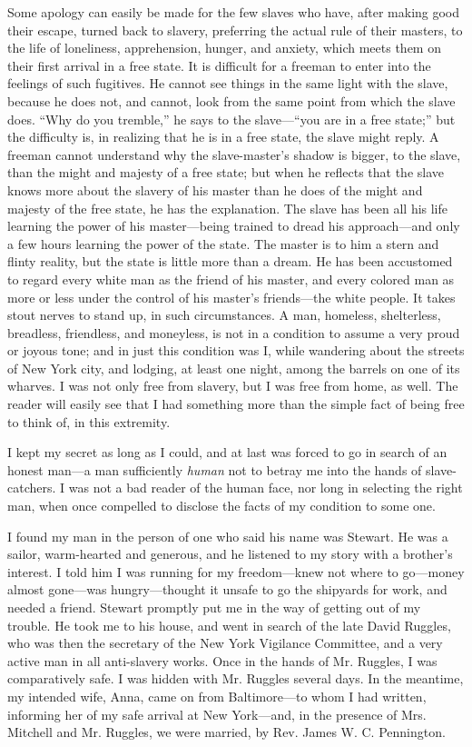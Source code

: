 Some apology can easily be made for the few slaves who have, after
making good their escape, turned back to slavery, preferring the actual
rule of their masters, to the life of loneliness, apprehension, hunger,
and anxiety, which meets them on their first arrival in a free state. It
is difficult for a freeman to enter into the feelings of such fugitives.
He cannot see things in the same light with the slave, because he does
not, and cannot, look from the same point from which the slave does.
``Why do you tremble,'' he says to the slave---``you are in a free
state;'' but the difficulty is, in realizing that he is in a free state,
the slave might reply. A freeman cannot understand why the
slave-master's shadow is bigger, to the slave, than the might and
majesty of a free state; but when he reflects that the slave knows more
about the slavery of his master than he does of the might and majesty of
the free state, he has the explanation. The slave has been all his life
learning the power of his master---being trained to dread his
approach---and only a few hours learning the power of the state. The
master is to him a stern and flinty reality, but the state is little
more than a dream. He has been accustomed to regard every white man as
the friend of his master, and every colored man as more or less under
the control of his {}master's friends---the white people. It takes stout
nerves to stand up, in such circumstances. A man, homeless, shelterless,
breadless, friendless, and moneyless, is not in a condition to assume a
very proud or joyous tone; and in just this condition was I, while
wandering about the streets of New York city, and lodging, at least one
night, among the barrels on one of its wharves. I was not only free from
slavery, but I was free from home, as well. The reader will easily see
that I had something more than the simple fact of being free to think
of, in this extremity.

I kept my secret as long as I could, and at last was forced to go in
search of an honest man---a man sufficiently \emph{human} not to betray
me into the hands of slave-catchers. I was not a bad reader of the human
face, nor long in selecting the right man, when once compelled to
disclose the facts of my condition to some one.

I found my man in the person of one who said his name was Stewart. He
was a sailor, warm-hearted and generous, and he listened to my story
with a brother's interest. I told him I was running for my
freedom---knew not where to go---money almost gone---was
hungry---thought it unsafe to go the shipyards for work, and needed a
friend. Stewart promptly put me in the way of getting out of my trouble.
He took me to his house, and went in search of the late David Ruggles,
who was then the secretary of the New York Vigilance Committee, and a
very active man in all anti-slavery works. Once in the hands of Mr.
Ruggles, I was comparatively safe. I was {}hidden with Mr. Ruggles
several days. In the meantime, my intended wife, Anna, came on from
Baltimore---to whom I had written, informing her of my safe arrival at
New York---and, in the presence of Mrs. Mitchell and Mr. Ruggles, we
were married, by Rev. James W. C. Pennington.

